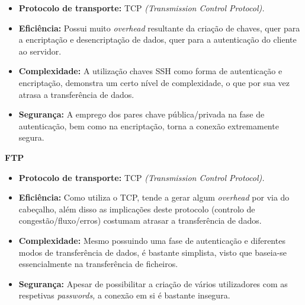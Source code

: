         \begin{itemize}
            
            \item \textbf{Protocolo de transporte:} TCP \textit{(Transmission Control Protocol).} 
            
            \item \textbf{Eficiência:} Possui muito \textit{overhead} resultante da criação de chaves, quer para a encriptação e desencriptação de dados, quer para a autenticação do cliente ao servidor.  
            
            \item \textbf{Complexidade:} A utilização chaves SSH como forma de autenticação e encriptação, demonstra um certo nível de complexidade, o que por sua vez atrasa a transferência de dados.
            
            \item \textbf{Segurança:} A emprego dos pares chave pública/privada na fase de autenticação, bem como na encriptação, torna a conexão extremamente segura.
        
        \end{itemize}

        \textbf{\large FTP}
        \begin{itemize}
            
            \item \textbf{Protocolo de transporte:} TCP \textit{(Transmission Control Protocol).} 
            
            \item \textbf{Eficiência:} Como utiliza o TCP, tende a gerar algum \textit{overhead} por via do cabeçalho, além disso as implicações deste protocolo (controlo de congestão/fluxo/erros) costumam atrasar a transferência de dados. 
            
            \item \textbf{Complexidade:} Mesmo possuindo uma fase de autenticação e diferentes modos de transferência de dados, é bastante simplista, visto que baseia-se essencialmente na transferência de ficheiros.
            
            \item \textbf{Segurança:} Apesar de possibilitar a criação de vários utilizadores com as respetivas \textit{passwords,} a conexão em si é bastante insegura.
        
        \end{itemize}

